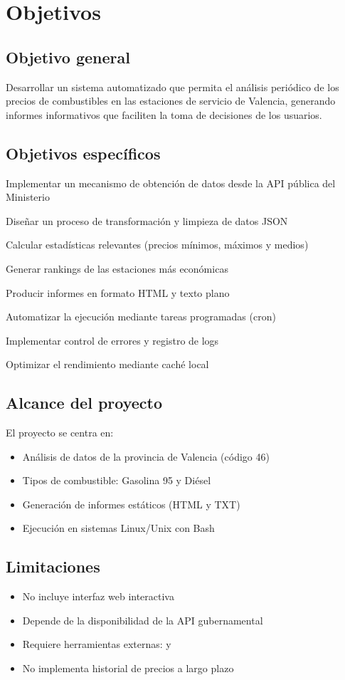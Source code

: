 \chapter{Objetivos}

\section{Objetivo general}

Desarrollar un sistema automatizado que permita el análisis periódico de los precios de combustibles en las estaciones de servicio de Valencia, generando informes informativos que faciliten la toma de decisiones de los usuarios.

\section{Objetivos específicos}

\begin{objetivos}
  \item Implementar un mecanismo de obtención de datos desde la API pública del Ministerio
  \item Diseñar un proceso de transformación y limpieza de datos JSON
  \item Calcular estadísticas relevantes (precios mínimos, máximos y medios)
  \item Generar rankings de las estaciones más económicas
  \item Producir informes en formato HTML y texto plano
  \item Automatizar la ejecución mediante tareas programadas (cron)
  \item Implementar control de errores y registro de logs
  \item Optimizar el rendimiento mediante caché local
\end{objetivos}

\section{Alcance del proyecto}

El proyecto se centra en:

\begin{itemize}
  \item Análisis de datos de la provincia de Valencia (código 46)
  \item Tipos de combustible: Gasolina 95 y Diésel
  \item Generación de informes estáticos (HTML y TXT)
  \item Ejecución en sistemas Linux/Unix con Bash
\end{itemize}

\section{Limitaciones}

\begin{itemize}
  \item No incluye interfaz web interactiva
  \item Depende de la disponibilidad de la API gubernamental
  \item Requiere herramientas externas:  y 
  \item No implementa historial de precios a largo plazo
\end{itemize}
